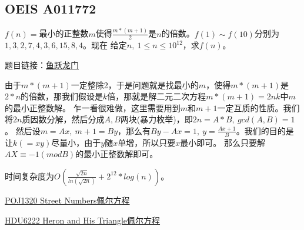 \subsection{OEIS A011772}
$f(n)=$最小的正整数$m$使得$\frac{m*(m+1)}{2}$是$n$的倍数。$f(1)\sim f(10)$分别为$1, 3, 2, 7, 4, 3, 6, 15, 8, 4$。现在
给定$n,\ 1\le n\le 10^{12}$，求$f(n)$。

题目链接：\href{https://www.cometoj.com/contest/65/problem/C?problem_id=3684}{鱼跃龙门}

\begin{solution}
	由于$m*(m+1)$一定整除2，于是问题就是找最小的$m$，使得$m*(m+1)$是$2*n$的倍数，那我们假设是$k$倍，那就是解二元二次方程$m*(m+1) = 2nk$中$m$的最小正整数解。
	乍一看很难做，这里需要用到$m$和$m+1$一定互质的性质。我们将$2n$质因数分解，然后分成$A,B$两块(暴力枚举)，即$2n = A*B,\ gcd(A,B)=1$。
	然后设$m=Ax,\ m+1=By$，那么有$By-Ax=1,\ y=\frac{Ax+1}{B}$。我们的目的是让$k(=xy)$尽量小，由于$y$随$x$单增，所以只要$x$最小即可。
	那么只要解$AX\equiv -1  (mod B)$的最小正整数解即可。
	
	时间复杂度为$O(\frac{\sqrt{2n}}{ln(\sqrt{2n})}+2^{12}*log(n))$。
\end{solution}


	

\vbox{}

\vbox{}	

\begin{problemset}
	\item \href{http://poj.org/problem?id=1320}{POJ1320 \quad Street Numbers\quad 佩尔方程}
	\item \href{http://acm.hdu.edu.cn/showproblem.php?pid=6222}{HDU6222 \quad Heron and His Triangle\quad 佩尔方程}
\end{problemset}